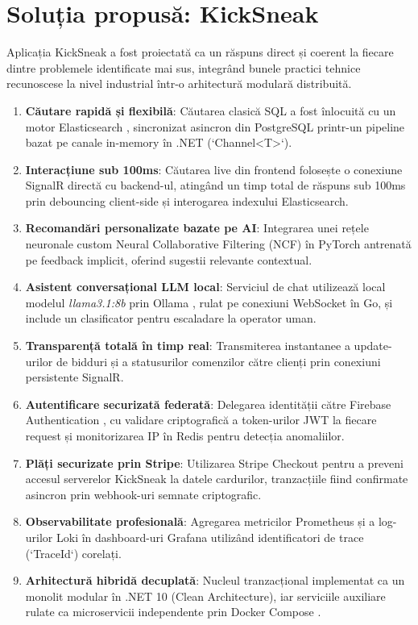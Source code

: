 \section{Soluția propusă: KickSneak}

Aplicația KickSneak a fost proiectată ca un răspuns direct și coerent la fiecare dintre problemele identificate mai sus, integrând bunele practici tehnice recunoscese la nivel industrial într-o arhitectură modulară distribuită.

\begin{enumerate}
    \item \textbf{Căutare rapidă și flexibilă}: Căutarea clasică SQL a fost înlocuită cu un motor Elasticsearch \cite{elasticsearch2026search}, sincronizat asincron din PostgreSQL printr-un pipeline bazat pe canale in-memory în .NET (`Channel<T>`).
    \item \textbf{Interacțiune sub 100ms}: Căutarea live din frontend folosește o conexiune SignalR directă cu backend-ul, atingând un timp total de răspuns sub 100ms prin debouncing client-side și interogarea indexului Elasticsearch.
    \item \textbf{Recomandări personalizate bazate pe AI}: Integrarea unei rețele neuronale custom Neural Collaborative Filtering (NCF) în PyTorch \cite{he2017ncf} antrenată pe feedback implicit, oferind sugestii relevante contextual.
    \item \textbf{Asistent conversațional LLM local}: Serviciul de chat utilizează local modelul \textit{llama3.1:8b} prin Ollama \cite{ollama2026llm}, rulat pe conexiuni WebSocket în Go, și include un clasificator pentru escaladare la operator uman.
    \item \textbf{Transparență totală în timp real}: Transmiterea instantanee a update-urilor de bidduri și a statusurilor comenzilor către clienți prin conexiuni persistente SignalR.
    \item \textbf{Autentificare securizată federată}: Delegarea identității către Firebase Authentication \cite{firebase2026auth}, cu validare criptografică a token-urilor JWT la fiecare request și monitorizarea IP în Redis pentru detecția anomaliilor.
    \item \textbf{Plăți securizate prin Stripe}: Utilizarea Stripe Checkout \cite{stripe2026api} pentru a preveni accesul serverelor KickSneak la datele cardurilor, tranzacțiile fiind confirmate asincron prin webhook-uri semnate criptografic.
    \item \textbf{Observabilitate profesională}: Agregarea metricilor Prometheus și a log-urilor Loki în dashboard-uri Grafana utilizând identificatori de trace (`TraceId`) corelați.
    \item \textbf{Arhitectură hibridă decuplată}: Nucleul tranzacțional implementat ca un monolit modular în .NET 10 (Clean Architecture), iar serviciile auxiliare rulate ca microservicii independente prin Docker Compose \cite{docker2026compose}.
\end{enumerate}

